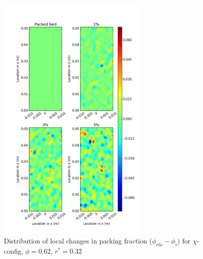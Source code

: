 \begin{figure}[!t]
    \centering
    \includegraphics[width = 0.65\textwidth]{figures/x-62-r23-1-deltas.png}
    \caption{Distribution of local changes in packing fraction ($\phi_{eta} - \phi_i$) for $\chi$-config, $\phi = 0.62$, $r^* = 0.32$}\label{fig:x-62-r23-deltas}
\end{figure}

